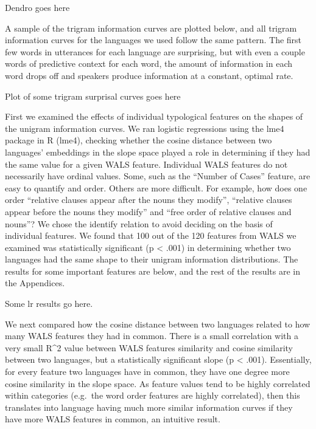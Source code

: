 \documentclass[11pt,]{article}
\begin{document}
Dendro goes here

A sample of the trigram information curves are plotted below, and all trigram information curves for the languages we used follow the same pattern. The first few words in utterances for each language are surprising, but with even a couple words of predictive context for each word, the amount of information in each word drops off and speakers produce information at a constant, optimal rate.

Plot of some trigram surprisal curves goes here

First we examined the effects of individual typological features on the shapes of the unigram information curves. We ran logistic regressions using the lme4 package in R (lme4), checking whether the cosine distance between two languages' embeddings in the slope space played a role in determining if they had the same value for a given WALS feature. Individual WALS features do not necessarily have ordinal values. Some, such as the ``Number of Cases'' feature, are easy to quantify and order. Others are more difficult. For example, how does one order ``relative clauses appear after the nouns they modify'', ``relative clauses appear before the nouns they modify'' and ``free order of relative clauses and nouns''? We chose the identify relation to avoid deciding on the basis of individual features. We found that 100 out of the 120 features from WALS we examined was statistically significant (p \textless{} .001) in determining whether two languages had the same shape to their unigram information distributions. The results for some important features are below, and the rest of the results are in the Appendices.

Some lr results go here.

We next compared how the cosine distance between two languages related to how many WALS features they had in common. There is a small correlation with a very small R\^{}2 value between WALS features similarity and cosine similarity between two languages, but a statistically significant slope (p \textless{} .001). Essentially, for every feature two languages have in common, they have one degree more cosine similarity in the slope space. As feature values tend to be highly correlated within categories (e.g.~the word order features are highly correlated), then this translates into language having much more similar information curves if they have more WALS features in common, an intuitive result.
\end{document}
